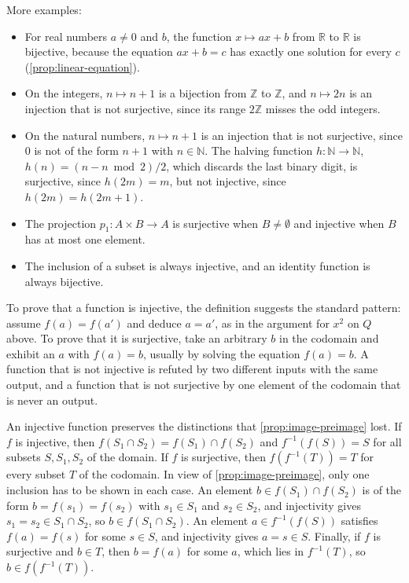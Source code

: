More examples:
\begin{itemize}
\item For real numbers $a\ne0$ and $b$, the function $x\mapsto ax+b$ from $\mathbb R$ to $\mathbb R$ is bijective, because the equation $ax+b=c$ has exactly one solution for every $c$ (\cref{prop:linear-equation}).
\item On the integers, $n\mapsto n+1$ is a bijection from $\mathbb Z$ to $\mathbb Z$, and $n\mapsto2n$ is an injection that is not surjective, since its range $2\mathbb Z$ misses the odd integers.
\item On the natural numbers, $n\mapsto n+1$ is an injection that is not surjective, since $0$ is not of the form $n+1$ with $n\in\mathbb N$. The halving function $h\colon\mathbb N\to\mathbb N$, $h(n)=(n-n\bmod2)/2$, which discards the last binary digit, is surjective, since $h(2m)=m$, but not injective, since $h(2m)=h(2m+1)$.
\item The projection $p_1\colon A\times B\to A$ is surjective when $B\ne\emptyset$ and injective when $B$ has at most one element.
\item The inclusion of a subset is always injective, and an identity function is always bijective.
\end{itemize}

To prove that a function is injective, the definition suggests the standard pattern: assume $f(a)=f(a')$ and deduce $a=a'$, as in the argument for $x^2$ on $Q$ above. To prove that it is surjective, take an arbitrary $b$ in the codomain and exhibit an $a$ with $f(a)=b$, usually by solving the equation $f(a)=b$. A function that is not injective is refuted by two different inputs with the same output, and a function that is not surjective by one element of the codomain that is never an output.

An injective function preserves the distinctions that \cref{prop:image-preimage} lost. If $f$ is injective, then $f(S_1\cap S_2)=f(S_1)\cap f(S_2)$ and $f^{-1}(f(S))=S$ for all subsets $S,S_1,S_2$ of the domain. If $f$ is surjective, then $f(f^{-1}(T))=T$ for every subset $T$ of the codomain. In view of \cref{prop:image-preimage}, only one inclusion has to be shown in each case. An element $b\in f(S_1)\cap f(S_2)$ is of the form $b=f(s_1)=f(s_2)$ with $s_1\in S_1$ and $s_2\in S_2$, and injectivity gives $s_1=s_2\in S_1\cap S_2$, so $b\in f(S_1\cap S_2)$. An element $a\in f^{-1}(f(S))$ satisfies $f(a)=f(s)$ for some $s\in S$, and injectivity gives $a=s\in S$. Finally, if $f$ is surjective and $b\in T$, then $b=f(a)$ for some $a$, which lies in $f^{-1}(T)$, so $b\in f(f^{-1}(T))$.

